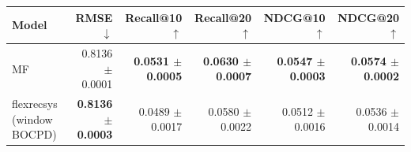 \begin{tabular}{lrrrrr}
\toprule
Model & RMSE $\downarrow$ & Recall@10 $\uparrow$ & Recall@20 $\uparrow$ & NDCG@10 $\uparrow$ & NDCG@20 $\uparrow$ \\
\midrule
MF & 0.8136 $\pm$ 0.0001 & \textbf{0.0531 $\pm$ 0.0005} & \textbf{0.0630 $\pm$ 0.0007} & \textbf{0.0547 $\pm$ 0.0003} & \textbf{0.0574 $\pm$ 0.0002} \\
flexrecsys (window BOCPD) & \textbf{0.8136 $\pm$ 0.0003} & 0.0489 $\pm$ 0.0017 & 0.0580 $\pm$ 0.0022 & 0.0512 $\pm$ 0.0016 & 0.0536 $\pm$ 0.0014 \\
\bottomrule
\end{tabular}

